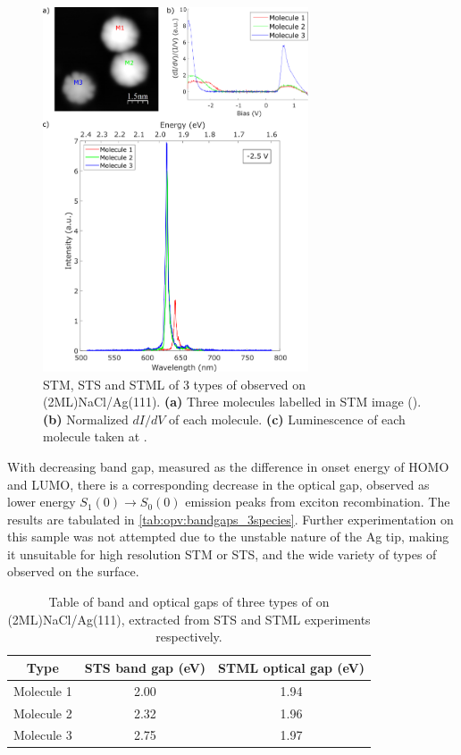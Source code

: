 \begin{figure} [H]
    \centering
        \includegraphics[width=0.7\textwidth]{pictures/3species_diagram.png}
        \caption{STM, STS and STML of 3 types of  observed on (2ML)NaCl/Ag(111). \textbf{(a)} Three molecules labelled in STM image (). \textbf{(b)} Normalized $dI/dV$ of each molecule. \textbf{(c)} Luminescence of each molecule taken at . }
    \label{fig:opv:f8znpc-sts_stml}
\end{figure}


With decreasing band gap, measured as the difference in onset energy of HOMO and LUMO, there is a corresponding decrease in the optical gap, observed as lower energy $S_1(0) \rightarrow S_0(0)$ emission peaks from exciton recombination. The results are tabulated in \autoref{tab:opv:bandgaps_3species}. Further experimentation on this sample was not attempted due to the unstable nature of the Ag tip, making it unsuitable for high resolution \ac{STM} or \ac{STS}, and the wide variety of types of  observed on the surface.
 
 \begin{table}[H]
\begin{center}
    \begin{tabular}{|c|c|c|} 
    \hline
        Type  & STS band gap (eV)  &  STML optical gap (eV) \\
        \hline
        Molecule 1  &    2.00   & 1.94   \\
        Molecule 2  &    2.32   & 1.96 \\
        Molecule 3  &    2.75   & 1.97 \\
        \hline
    \end{tabular}
    \caption{Table of band and optical gaps of three types of  on (2ML)NaCl/Ag(111), extracted from STS and STML experiments respectively.}
    \label{tab:opv:bandgaps_3species}
    \end{center}
\end{table}


